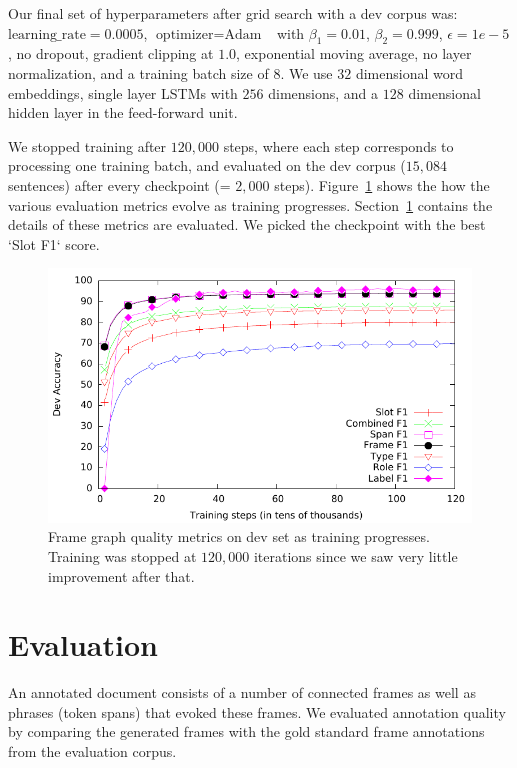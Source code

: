 \documentclass[11pt,a4paper]{article}
\begin{document}
 Our final set of hyperparameters after
grid search with a dev corpus was: $\mbox{learning\_rate} = 0.0005$,
$\mbox{optimizer} = \mbox{Adam}$~\cite{kingma2014} with $\beta_1 = 0.01$, $\beta_2 = 0.999$,
$\epsilon = 1e-5$, no dropout, gradient clipping at $1.0$, exponential moving
average, no layer normalization, and a training batch size of $8$. We use
$32$ dimensional word embeddings, single layer LSTMs with $256$ dimensions,
and a $128$ dimensional hidden layer in the feed-forward unit.

We stopped training after $120,000$ steps, where each step corresponds to
processing one training batch, and evaluated on the dev corpus
($15,084$ sentences) after every checkpoint (= $2,000$ steps).
Figure~\ref{fig:dev-eval} shows the how the various evaluation metrics evolve
as training progresses. Section~\ref{sec:eval} contains the details of these
metrics are evaluated. We picked the checkpoint with the best `Slot F1` score.

\begin{figure}
\centering
\includegraphics[width=\columnwidth]{dev-eval.pdf}
  \caption{Frame graph quality metrics on dev set as training progresses.
	Training was stopped at $120,000$ iterations since we saw very little
	improvement after that.}
  \label{fig:dev-eval}
\end{figure}

\section{Evaluation}
\label{sec:eval}

An annotated document consists of a number of connected frames as well as
phrases (token spans) that evoked these frames. We evaluated
annotation quality by comparing the generated frames with the gold standard frame
annotations from the evaluation corpus.
\end{document}
